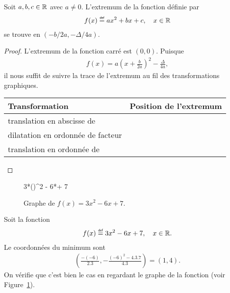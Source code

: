 \documentclass[main.tex]{subfiles}
\begin{document}
\begin{corollary}
    Soit $a, b, c \in \mathbb{R}$ avec $a \neq 0$.
    L'extremum de la fonction définie par
    \begin{align}
        f(x) \defeq ax^2 + bx + c,
        \quad x \in \R
    \end{align}
    se trouve en $(-b/2a, -\Delta/4a)$.
\end{corollary}
\begin{proof}
    L'extremum de la fonction carré est $(0, 0)$.
    Puisque
    \begin{align}
        f(x) = a\left(x + \frac b {2a}\right)^2 - \frac \Delta {4a},
    \end{align}
    il nous suffit de suivre la trace de l'extremum au fil des transformations graphiques.

    \begin{center}
        \begin{tabular}{l{10cm} l{10cm}}
            \toprule
            Transformation & Position de l'extremum\\
            \midrule
            translation en abscisse de \hspace{3cm} & \\
            dilatation en ordonnée de facteur \hspace {1cm} & \\
            translation en ordonnée de \hspace{3cm} & \\
            \bottomrule
        \end{tabular}
    \end{center}
\end{proof}

\begin{figure}
    \centering
    \begin{plot}{0.25}{-4}{-1}{6}{16}
         {3*(\x)^2 - 6*\x + 7}
    \end{plot}
    \caption{Graphe de $f(x) = 3x^2 - 6x + 7$.}
    \label{figure:parabola_ex}
\end{figure}

\begin{example}
    Soit la fonction
    \begin{align}
        f(x) \defeq 3x^2 - 6x + 7,
        \quad x \in \R.
    \end{align}
    Le coordonnées du minimum sont
    \begin{align}
        \left(\frac {-(-6)} {2 . 3}, -\frac {(-6)^2 - 4.3.7} {4.3}\right)
        = (1, 4).
    \end{align}
    On vérifie que c'est bien le cas en regardant le graphe de la fonction
    (voir Figure~\ref{figure:parabola_ex}).
\end{example}
\end{document}
